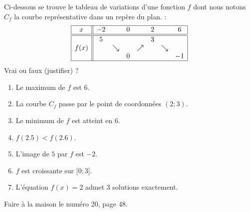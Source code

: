 
\begin{exercice}\label{exosmath-0549}

    Ci-dessous se trouve le tableau de variations d'une fonction \( f\) dont nous notons \( C_f\) la courbe représentative dans un repère du plan. :
    \begin{equation*}
        \begin{array}[]{|c||ccccccc|}
            \hline
            x&-2&&0&&2&&6\\
            \hline\hline
            &5&&&&3&&\\
            f(x)&&\searrow&&\nearrow&&\searrow&\\
            &&&0&&&&-1\\
            \hline
        \end{array}
    \end{equation*}
    Vrai ou faux (justifier) ?
    \begin{enumerate}
        \item
            Le maximum de $f$ est \( 6\).
        \item
            La courbe \( C_f\) passe par le point de coordonnées \( (2;3)\).
        \item
            Le minimum de \( f\) est atteint en \( 6\).
        \item
            \( f(2.5)<f(2.6)\).
        \item
            L'image de \( 5\) par \( f\) est \( -2\).
        \item
            \( f\) est croissante sur \( \mathopen[ 0 ; 3 \mathclose]\).
        \item
            L'équation \( f(x)=2\) admet \( 3\) solutions exactement.
    \end{enumerate}

    Faire à la maison le numéro 20, page 48.

\end{exercice}
